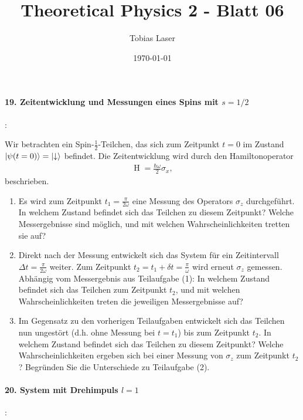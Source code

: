 \documentclass[11pt,a4paper]{scrartcl}
\begin{document}
    \title{Theoretical Physics 2 - Blatt 06}
    \author{Tobias Laser}
    \date{\today}
    \maketitle
    \vfill
    \thispagestyle{empty}


    \paragraph{19. Zeitentwicklung und Messungen eines Spins mit $s = 1 / 2$}:
    
    Wir betrachten ein Spin-$\frac{1}{2}$-Teilchen, das sich zum Zeitpunkt $t = 0$ im  Zustand $\ket{\psi(t = 0)} = \ket{\downarrow}$ befindet. Die Zeitentwicklung wird durch den Hamiltonoperator
    \begin{align*}
        \operatorname{H} = \frac{\hbar \omega}{2} \sigma_x,
    \end{align*} 
    beschrieben.
    \begin{enumerate}
        \item Es wird zum Zeitpunkt $t_1 = \frac{\pi}{2 \omega}$ eine Messung des Operators $\sigma_z$ durchgeführt. In welchem Zustand befindet sich das Teilchen zu diesem Zeitpunkt? Welche Messergebnisse sind möglich, und mit welchen Wahrscheinlichkeiten tretten sie auf?
        \item Direkt nach der Messung entwickelt sich das System für ein Zeitintervall $\Delta t = \frac{\pi}{2\omega}$ weiter. Zum Zeitpunkt $t_2 = t_1 + \delta t = \frac{\pi}{\omega}$ wird erneut $\sigma_z$ gemessen. Abhängig vom Messergebnis aus Teilaufgabe (1): In welchem Zustand befindet sich das Teilchen zum Zeitpunkt $t_2$, und mit welchen Wahrscheinlichkeiten treten die jeweiligen Messergebnisse auf?
        \item Im Gegensatz zu den vorherigen Teilaufgaben entwickelt sich das Teilchen nun ungestört (d.h. ohne Messung bei $t=t_1$) bis zum Zeitpunkt $t_2$. In welchem Zustand befindet sich das Teilchen zu diesem Zeitpunkt? Welche Wahrscheinlichkeiten ergeben sich bei einer Messung von $\sigma_z$ zum Zeitpunkt $t_2$? Begründen Sie die Unterschiede zu Teilaufgabe (2).
    \end{enumerate}

    \paragraph{20. System mit Drehimpuls $l=1$}:
\end{document}
